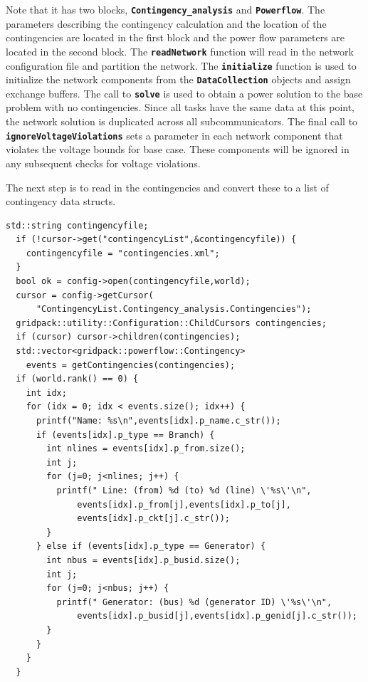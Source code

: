 \documentclass[12pt]{report} %
\begin{document}
Note that it has two blocks, \texttt{\textbf{Contingency\_analysis}} and \texttt{\textbf{Powerflow}}. The parameters describing the contingency calculation and the location of the contingencies are located in the first block and the power flow parameters are located in the second block. The \texttt{\textbf{readNetwork}} function will read in the network configuration file and partition the network. The \texttt{\textbf{initialize}} function is used to initialize the network components from the \texttt{\textbf{DataCollection}} objects and assign exchange buffers. The call to \texttt{\textbf{solve}} is used to obtain a power solution to the base problem with no contingencies. Since all tasks have the same data at this point, the network solution is duplicated across all subcommunicators. The final call to \texttt{\textbf{ignoreVoltageViolations}} sets a parameter in each network component that violates the voltage bounds for base case. These components will be ignored in any subsequent checks for voltage violations.

The next step is to read in the contingencies and convert these to a list of contingency data structs.

{
\color{red}
\begin{Verbatim}[fontseries=b]
  std::string contingencyfile;
  if (!cursor->get("contingencyList",&contingencyfile)) {
    contingencyfile = "contingencies.xml";
  }
  bool ok = config->open(contingencyfile,world);
  cursor = config->getCursor(
      "ContingencyList.Contingency_analysis.Contingencies");
  gridpack::utility::Configuration::ChildCursors contingencies;
  if (cursor) cursor->children(contingencies);
  std::vector<gridpack::powerflow::Contingency>
    events = getContingencies(contingencies);
  if (world.rank() == 0) {
    int idx;
    for (idx = 0; idx < events.size(); idx++) {
      printf("Name: %s\n",events[idx].p_name.c_str());
      if (events[idx].p_type == Branch) {
        int nlines = events[idx].p_from.size();
        int j;
        for (j=0; j<nlines; j++) {
          printf(" Line: (from) %d (to) %d (line) \'%s\'\n",
              events[idx].p_from[j],events[idx].p_to[j],
              events[idx].p_ckt[j].c_str());
        }
      } else if (events[idx].p_type == Generator) {
        int nbus = events[idx].p_busid.size();
        int j;
        for (j=0; j<nbus; j++) {
          printf(" Generator: (bus) %d (generator ID) \'%s\'\n",
              events[idx].p_busid[j],events[idx].p_genid[j].c_str());
        }
      }
    }
  }
\end{Verbatim}
}
\end{document}
